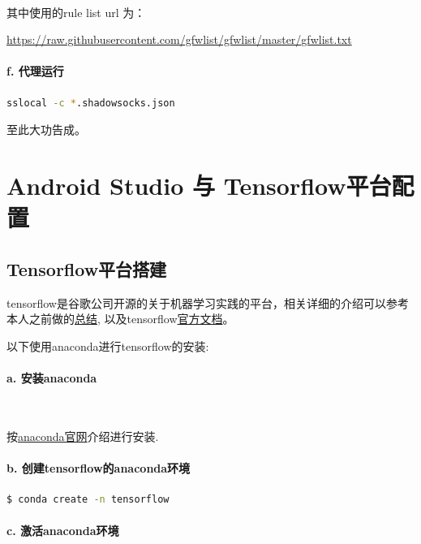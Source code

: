 \documentclass[UTF8, Microsoft YaHei]{book}
\begin{document}
    ~

    其中使用的rule list url 为：

    \url{https://raw.githubusercontent.com/gfwlist/gfwlist/master/gfwlist.txt}

    \paragraph{f. 代理运行}

    \begin{lstlisting}[language=bash]
    sslocal -c *.shadowsocks.json
    \end{lstlisting}

    至此大功告成。

    \section{Android Studio 与 Tensorflow平台配置}
    \subsection{Tensorflow平台搭建}
    tensorflow是谷歌公司开源的关于机器学习实践的平台，相关详细的介绍可以参考本人之前做的\href{https://github.com/WilliamYi96/Machine-Learning/blob/master/ML_Theories/Tensorflow/MNIST_for_ML_beginners%24Experts.md}{总结},  以及tensorflow\href{https://www.tensorflow.org/}{官方文档}。

    以下使用anaconda进行tensorflow的安装:

    \paragraph{a. 安装anaconda}

    ~

    按\href{https://www.continuum.io/downloads}{anaconda官网}介绍进行安装.

    \paragraph{b. 创建tensorflow的anaconda环境}

    \begin{lstlisting}[language=bash]
    $ conda create -n tensorflow
    \end{lstlisting}

    \paragraph{c. 激活anaconda环境}
\end{document}
